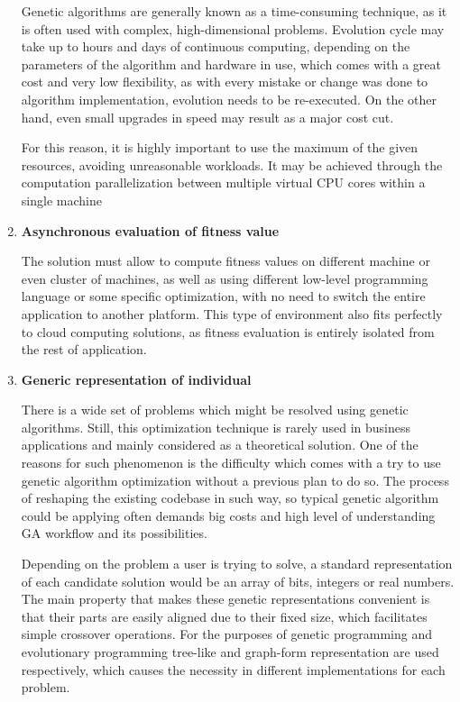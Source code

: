 \begin{enumerate}
Genetic algorithms are generally known as a time-consuming technique, as it is often used with complex, high-dimensional problems. Evolution cycle may take up to hours and days of continuous computing, depending on the parameters of the algorithm and hardware in use, which comes with a great cost and very low flexibility, as with every mistake or change was done to algorithm implementation, evolution needs to be re-executed. On the other hand, even small upgrades in speed may result as a major cost cut.

For this reason, it is highly important to use the maximum of the given resources, avoiding unreasonable workloads. It may be achieved through the computation parallelization between multiple virtual CPU cores within a single machine
\medbreak

\item \label{freq:async} \textbf{Asynchronous evaluation of fitness value}

The solution must allow to compute fitness values on different machine or even cluster of machines, as well as using different low-level programming language or some specific optimization, with no need to switch the entire application to another platform. This type of environment also fits perfectly to cloud computing solutions, as fitness evaluation is entirely isolated from the rest of application.
\medbreak

\item \label{freq:generic} \textbf{Generic representation of individual}

There is a wide set of problems which might be resolved using genetic algorithms. Still, this optimization technique is rarely used in business applications and mainly considered as a theoretical solution. One of the reasons for such phenomenon is the difficulty which comes with a try to use genetic algorithm optimization without a previous plan to do so. The process of reshaping the existing codebase in such way, so typical genetic algorithm could be applying often demands big costs and high level of understanding GA workflow and its possibilities.

Depending on the problem a user is trying to solve, a standard representation of each candidate solution would be an array of bits, integers or real numbers. The main property that makes these genetic representations convenient is that their parts are easily aligned due to their fixed size, which facilitates simple crossover operations. For the purposes of genetic programming and evolutionary programming tree-like and graph-form representation are used respectively, which causes the necessity in different implementations for each problem.


\end{enumerate}
